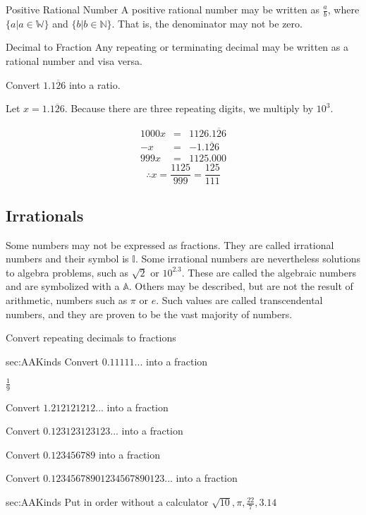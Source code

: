 \begin{derivation}{Positive Rational Number}
A positive rational number may be written as $\frac{a}{b}$, where $\{a | a \in \mathbb{W}\}$ and
$\{b | b \in \mathbb{N}\}$.  That is, the denominator may not be zero.
\end{derivation}



\begin{derivation}{Decimal to Fraction}
Any repeating or terminating decimal may be written as a rational number and visa versa.
\end{derivation}


\begin{example}
\exProblem
Convert $1.\overline{126}$ into a ratio.

\exSolution
Let $x = 1.\overline{126}$.  Because there are three repeating digits, we multiply by $10^3$.

\begin{align*}
1000x & = & 1126.\overline{126}\\
- x & = & -1.\overline{126}\\
\hline
999x & = & 1125.000
\end{align*}
$$
\therefore x = \frac{1125}{999} = \frac{125}{111}
$$
\end{example}





\subsection{Irrationals}
Some numbers may not be expressed as fractions.  They are called \gls{irrational numbers} and 
their symbol is $\mathbb{I}$.  Some irrational numbers are nevertheless solutions to algebra problems, 
such as $\sqrt{2}$ or $10^{2.3}$.  These are called the \gls{algebraic} numbers and are symbolized
with a $\mathbb{A}$.  Others may be described, but are not the result of arithmetic, numbers such 
as $\pi$ or $e$.  Such values are called \gls{transcendental} numbers, and they are proven to be the
vast majority of numbers.




\ExSection[Exercises]
Convert repeating decimals to fractions
\begin{exercises}{sec:AAKinds}
\prob{} Convert $0.11111...$ into a fraction
\begin{answer}
$\frac{1}{9}$
\end{answer}

\prob{}Convert $1.212121212...$ into a fraction

\prob{}Convert $0.123123123123...$ into a fraction

\prob{}Convert $0.123456789$ into a fraction

\prob{}Convert $0.12345678901234567890123...$ into a fraction

\end{exercises}

\begin{exercises}{sec:AAKinds}
\prob{} Put in order without a calculator $\sqrt{10}, \pi, \frac{22}{7}, 3.14$
\end{exercises}
